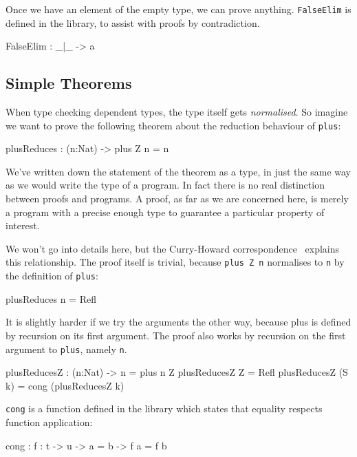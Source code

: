 Once we have an element of the empty type, we can prove anything.
\texttt{FalseElim} is defined in the library, to assist with proofs by contradiction.

\begin{code}
FalseElim : _|_ -> a
\end{code}

\subsection{Simple Theorems}

When type checking dependent types, the type itself gets \emph{normalised}.
So imagine we want to prove the following theorem about the reduction behaviour of \texttt{plus}:

\begin{code}
plusReduces : (n:Nat) -> plus Z n = n
\end{code}

\noindent
We've written down the statement of the theorem as a type, in just the same way as we would write the type of a program.
In fact there is no real distinction between proofs and programs.
A proof, as far as we are concerned here, is merely a program with a precise enough type to guarantee a particular property of interest.

We won't go into details here, but the Curry-Howard correspondence~\cite{howard} explains this relationship.
The proof itself is trivial, because \texttt{plus Z n} normalises to \texttt{n} by the definition of \texttt{plus}:

\begin{code}
plusReduces n = Refl
\end{code}

\noindent
It is slightly harder if we try the arguments the other way, because plus is defined by recursion on its first argument.
The proof also works by recursion on the first argument to \texttt{plus}, namely \texttt{n}.

\begin{code}
plusReducesZ : (n:Nat) -> n = plus n Z
plusReducesZ Z = Refl
plusReducesZ (S k) = cong (plusReducesZ k)
\end{code}

\noindent
\texttt{cong} is a function defined in the library which states that equality respects function application:

\begin{code}
cong : {f : t -> u} -> a = b -> f a = f b
\end{code}

